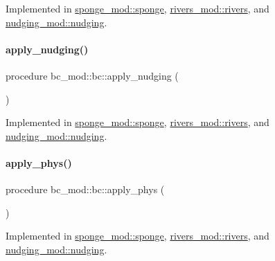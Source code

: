 Implemented in \mbox{\hyperlink{structsponge__mod_1_1sponge_aca76f3cc282e1918ec76c8d6c34d4315}{sponge\+\_\+mod\+::sponge}}, \mbox{\hyperlink{structrivers__mod_1_1rivers_a97eb13e48a07c9020cb1b353d42a5466}{rivers\+\_\+mod\+::rivers}}, and \mbox{\hyperlink{structnudging__mod_1_1nudging_ad5101760abbec7a50024ecc3435eda49}{nudging\+\_\+mod\+::nudging}}.

\mbox{\label{structbc__mod_1_1bc_a42dc448ba9e50fbb6b1acf03b0d121f3}} 
\paragraph{\texorpdfstring{apply\+\_\+nudging()}{apply\_nudging()}}
{\footnotesize\ttfamily procedure bc\+\_\+mod\+::bc\+::apply\+\_\+nudging (\begin{DoxyParamCaption}{ }\end{DoxyParamCaption})\hspace{0.3cm}{\ttfamily [private]}}



Implemented in \mbox{\hyperlink{structsponge__mod_1_1sponge_a8617d126acfe553a2d478258adaf029f}{sponge\+\_\+mod\+::sponge}}, \mbox{\hyperlink{structrivers__mod_1_1rivers_aaa8c35a085317190f69e097caba60cfb}{rivers\+\_\+mod\+::rivers}}, and \mbox{\hyperlink{structnudging__mod_1_1nudging_a232a6666abdc760493681d65cf8eb8e0}{nudging\+\_\+mod\+::nudging}}.

\mbox{\label{structbc__mod_1_1bc_ad0d03ece320569369a296ff3d4cf10d2}} 
\paragraph{\texorpdfstring{apply\+\_\+phys()}{apply\_phys()}}
{\footnotesize\ttfamily procedure bc\+\_\+mod\+::bc\+::apply\+\_\+phys (\begin{DoxyParamCaption}{ }\end{DoxyParamCaption})\hspace{0.3cm}{\ttfamily [private]}}



Implemented in \mbox{\hyperlink{structsponge__mod_1_1sponge_ab3f6fd55b37a4a4ba7fe9d0ac9f7b9ac}{sponge\+\_\+mod\+::sponge}}, \mbox{\hyperlink{structrivers__mod_1_1rivers_a4f6360b228319a4189289cafc2e3fd74}{rivers\+\_\+mod\+::rivers}}, and \mbox{\hyperlink{structnudging__mod_1_1nudging_a5e52b19bbb3e3481ebaa885040e92802}{nudging\+\_\+mod\+::nudging}}.

